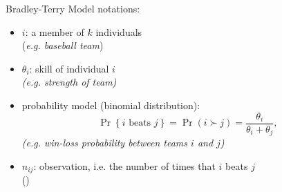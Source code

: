 \documentclass[fleqn,aspectratio=1610]{beamer}
\begin{document}
\begin{frame}[label={sec:org5218e6f}]{Bradley-Terry Model}
notations:
\begin{itemize}
\item \(i\): a member of \(k\) individuals\\[0pt]
(\emph{e.g. baseball team})
\item \(\theta_{i}\): skill of individual \(i\)\\[0pt]
\emph{(e.g. strength of team)}
\item probability model (binomial distribution): 
\begin{equation}
  \Pr\left\{\text{\(i\) beats \(j\)}\right\}
  =\Pr(i\succ j)
  =\frac{\theta_{i}}{\theta_{i}+\theta_{j}},
\end{equation}
\emph{(e.g. win-loss probability between teams \(i\) and \(j\))}
\item \(n_{ij}\): observation,
i.e. the number of times that \(i\) beats \(j\) \\[0pt]
(\cite{BradleyTerry1952})
\end{itemize}
\end{frame}
\end{document}
